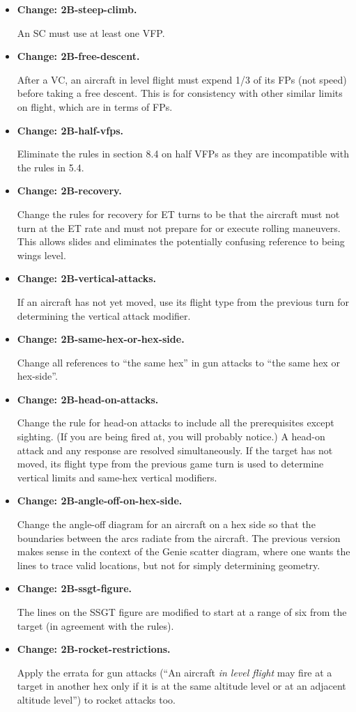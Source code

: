 \documentclass[10pt]{report}
\newcommand{\itemtag}[1]{\item \textbf{Change: #1.}\par}
\begin{document}
\begin{itemize}
    \itemtag{2B-steep-climb} An SC must use at least one VFP.


    \itemtag{2B-free-descent} After a VC, an aircraft in level flight must expend 1/3 of its FPs (not speed) before taking a free descent. This is for consistency with other similar limits on flight, which are in terms of FPs.

    \itemtag{2B-half-vfps} Eliminate the rules in section 8.4 on half VFPs as they are incompatible with the rules in 5.4.
    
    \itemtag{2B-recovery} Change the rules for recovery for ET turns to be that the aircraft must not turn at the ET rate and must not prepare for or execute rolling maneuvers. This allows slides and eliminates the potentially confusing reference to being wings level.

    \itemtag{2B-vertical-attacks} If an aircraft has not yet moved, use its flight type from the previous turn for determining the vertical attack modifier.
    
    \itemtag{2B-same-hex-or-hex-side} Change all references to “the same hex” in gun attacks to “the same hex or hex-side”.

    \itemtag{2B-head-on-attacks} Change the rule for head-on attacks to include all the prerequisites except sighting. (If you are being fired at, you will probably notice.) A head-on attack and any response are resolved simultaneously. If the target has not moved, its flight type from the previous game turn is used to determine vertical limits and same-hex vertical modifiers.

    \itemtag{2B-angle-off-on-hex-side} Change the angle-off diagram for an aircraft on a hex side so that the boundaries between the arcs radiate from the aircraft. The previous version makes sense in the context of the Genie scatter diagram, where one wants the lines to trace valid locations, but not for simply determining geometry.

    \itemtag{2B-ssgt-figure} The lines on the SSGT figure are modified to start at a range of six from the target (in agreement with the rules).
    
    \itemtag{2B-rocket-restrictions} Apply the errata for gun attacks (“An aircraft \emph{in level flight} may fire at a target in another hex only if it is at the same altitude level or at an adjacent altitude level”) to rocket attacks too.


\end{itemize}
\end{document}
